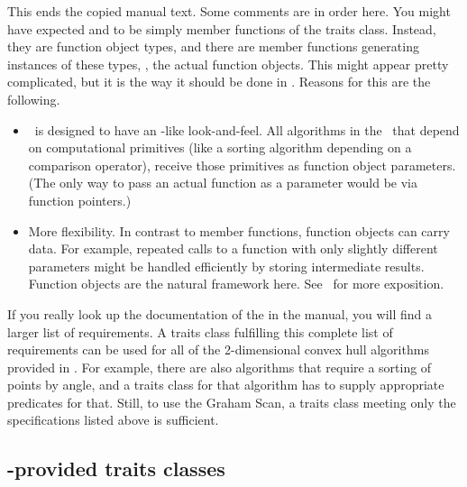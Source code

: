 This ends the copied manual text. 
Some comments are in order here. You might have expected 
and  to be simply member functions of the traits class.
Instead, they are function object types, and there are member 
functions generating instances of these types, \ie, the actual function 
objects. This might appear pretty complicated, but it is the way it should
be done in \cgal. Reasons for this are the following.
\begin{itemize}
\item \cgal\ is designed to have an \stl-like look-and-feel. 
      All algorithms in the \stl\ that depend on computational
      primitives (like a sorting algorithm depending on a comparison operator),
      receive those primitives as function object parameters. (The only way to
      pass an actual function as a parameter would be via function pointers.)
\item More flexibility. In contrast to member functions, function objects
      can carry data. For example, repeated calls to a function with only
      slightly different parameters might be handled efficiently by storing
      intermediate results. Function objects are the natural framework here.
      See~\cite{hhkps-aegk-01} for more exposition.
\end{itemize}
If you really look up the documentation of the 
 in the manual, you will find a larger
list of requirements. 
A traits class fulfilling this complete list of requirements can be used
for all of the 2-dimensional convex hull algorithms provided in \cgal. 
For example, there are also
algorithms that require a sorting of points by angle, and a traits class for
that algorithm has to supply appropriate predicates for that. Still, to use
the Graham Scan, a traits class meeting only the specifications listed above
is sufficient.

\subsection{\cgal-provided traits classes}
\label{subsec:cgal_traits_classes}

